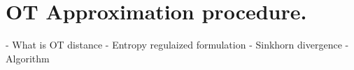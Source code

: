 \section{OT Approximation procedure.}

- What is OT distance
- Entropy regulaized formulation
- Sinkhorn divergence
- Algorithm
